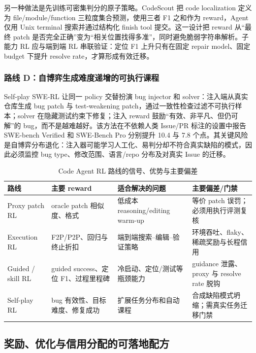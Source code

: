 \documentclass[10pt,a4paper,UTF8,fontset=none]{ctexart}
\begin{document}
另一种做法是先训练可密集判分的原子策略。CodeScout 把 code localization 定义为 file/module/function 三粒度集合预测，使用三者 F1 之和作为 reward，Agent 仅用 Unix terminal 搜索并通过结构化 finish tool 提交\cite{zh:sutawika2026codescout}。这一设计把 reward 从“最终 patch 是否完全正确”变为“相关位置找得多准”，同时避免脆弱字符串解析。子能力 RL 应与端到端 RL 串联验证：定位 F1 上升只有在固定 repair model、固定 budget 下提升 resolve rate，才算形成有效迁移。

\subsubsection{路线 D：自博弈生成难度递增的可执行课程}

Self-play SWE-RL 让同一 policy 交替扮演 bug injector 和 solver：注入端从真实仓库生成 bug patch 与 test-weakening patch，通过一致性检查过滤不可执行样本；solver 在隐藏测试约束下修复；注入 reward 鼓励“有效、非平凡、但仍可解”的 bug，而不是越难越好\cite{zh:wei2025selfplay}。该方法在不依赖人类 Issue/PR 标注的设置中报告 SWE-bench Verified 和 SWE-Bench Pro 分别提升 10.4 与 7.8 个点。其关键风险是自博弈分布退化：注入器可能学习人工化、易判分却不符合真实缺陷的模式，因此必须监控 bug type、修改范围、语言/repo 分布及对真实 Issue 的迁移。

\begin{table}[htbp]
\centering
\caption{Code Agent RL 路线的信号、优势与主要偏差}
\label{zh:tab:rl-routes}
\small
\begin{tabularx}{\textwidth}{p{2.2cm}p{3.2cm}YY}
\toprule
路线 & 主要 reward & 适合解决的问题 & 主要偏差/门禁 \\
\midrule
Proxy patch RL & oracle patch 相似度、格式 & 低成本 reasoning/editing warm-up & 等价 patch 误罚；必须用执行评测复核 \\
Execution RL & F2P/P2P、回归与终止折扣 & 端到端搜索--编辑--验证策略 & 环境吞吐、flaky、稀疏奖励与长程信用 \\
Guided / skill RL & guided success、定位 F1、过程里程碑 & 冷启动、定位/测试等瓶颈能力 & guidance 泄露、proxy 与 resolve rate 脱钩 \\
Self-play RL & bug 有效性、目标难度、修复成功 & 扩展任务分布和自动课程 & 合成缺陷模式坍缩；需真实任务迁移门禁 \\
\bottomrule
\end{tabularx}
\end{table}

\subsection{奖励、优化与信用分配的可落地配方}
\end{document}
